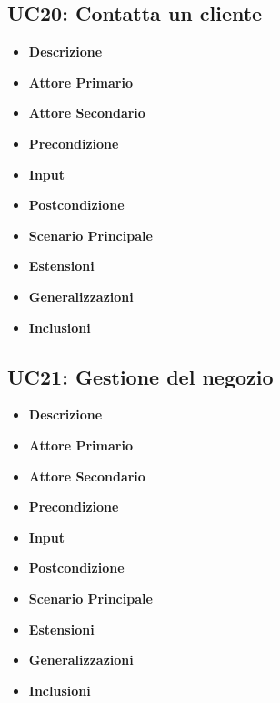         \subsection{UC20: Contatta un cliente}
        \begin{itemize}
            \item \textbf{Descrizione}
            \item \textbf{Attore Primario}
            \item \textbf{Attore Secondario}
            \item \textbf{Precondizione}
            \item \textbf{Input}
            \item \textbf{Postcondizione}
            \item \textbf{Scenario Principale}
            \item \textbf{Estensioni}
            \item \textbf{Generalizzazioni}
            \item \textbf{Inclusioni}
        \end{itemize}
        \subsection{UC21: Gestione del negozio}
        \begin{itemize}
            \item \textbf{Descrizione}
            \item \textbf{Attore Primario}
            \item \textbf{Attore Secondario}
            \item \textbf{Precondizione}
            \item \textbf{Input}
            \item \textbf{Postcondizione}
            \item \textbf{Scenario Principale}
            \item \textbf{Estensioni}
            \item \textbf{Generalizzazioni}
            \item \textbf{Inclusioni}
        \end{itemize}

